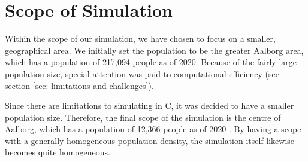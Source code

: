 \section{Scope of Simulation} \label{sec: Scope Simulation}
Within the scope of our simulation, we have chosen to focus on a smaller, geographical area. We initially set the population to be the greater Aalborg area, which has a population of 217,094 people \citep{sundhedsstyrelsen_by_2020} as of 2020. Because of the fairly large population size, special attention was paid to computational efficiency (see section \ref{sec: limitations and challenges}).

Since there are limitations to simulating in C, it was decided to have a smaller population size. Therefore, the final scope of the simulation is the centre of Aalborg, which has a population of 12,366 people as of 2020 \citep{sundhedsstyrelsen_by_2020}. By having a scope with a generally homogeneous population density, the simulation itself likewise becomes quite homogeneous.
